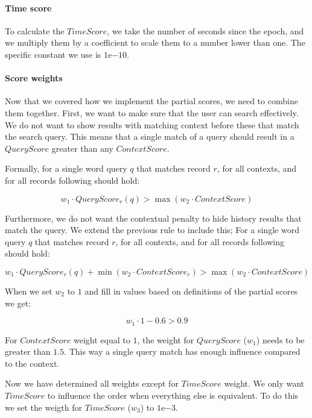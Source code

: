 \paragraph{Time score}


To calculate the \(TimeScore\), we take the number of seconds since the epoch, and we multiply them by a coefficient to scale them to a number lower than one. The specific constant we use is $1\mathrm{e}{-10}$.

\paragraph{Score weights}

Now that we covered how we implement the partial scores, we need to combine them together.
First, we want to make sure that the user can search effectively. We do not want to show results with matching context before these that match the search query. This means that a single match of a query should result in a \(QueryScore\) greater than any \(ContextScore\).

Formally, for a single word query \(q\) that matches record \(r\), for all contexts, and for all records following should hold: 

\[ w_1 \cdot QueryScore_r(q) > \max{(w_2 \cdot ContextScore)} \]

Furthermore, we do not want the contextual penalty to hide history results that match the query. We extend the previous rule to include this; For a single word query \(q\) that matches record \(r\), for all contexts, and for all records following should hold:

\[ w_1 \cdot QueryScore_r(q) + \min{(w_2 \cdot ContextScore_r)} > \max{(w_2 \cdot ContextScore)} \]

When we set \(w_2\) to \(1\) and fill in values based on definitions of the partial scores we get:

\[ w_1 \cdot 1 - 0.6 > 0.9 \]

For \(ContextScore\) weight equal to \(1\), the weight for \(QueryScore\) (\(w_1\)) needs to be greater than \(1.5\). This way a single query match has enough influence compared to the context.

Now we have determined all weights except for \(TimeScore\) weight. We only want \(TimeScore\) to influence the order when everything else is equivalent. To do this we set the weigth for \(TimeScore\) (\(w_3\)) to $1\mathrm{e}{-3}$.


